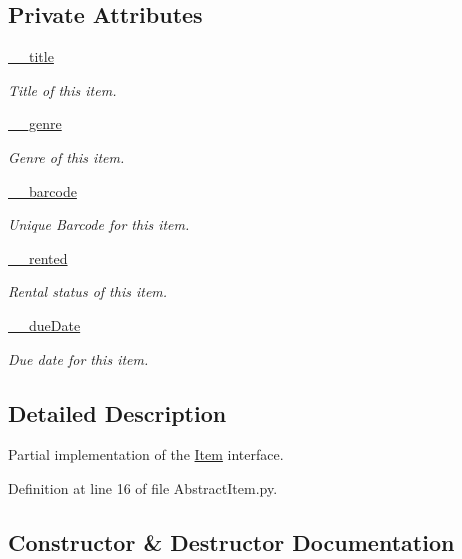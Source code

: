 \subsection*{Private Attributes}
\begin{DoxyCompactItemize}
\item 
\hyperlink{classAbstractItem_1_1AbstractItem_a2f4dc201ed6687e84b1b1b03863443c7}{\+\_\+\+\_\+title}
\begin{DoxyCompactList}\small\item\em Title of this item. \end{DoxyCompactList}\item 
\hyperlink{classAbstractItem_1_1AbstractItem_a9a18f410b1160da5c633a92ff228e5ee}{\+\_\+\+\_\+genre}
\begin{DoxyCompactList}\small\item\em Genre of this item. \end{DoxyCompactList}\item 
\hyperlink{classAbstractItem_1_1AbstractItem_a37fae73390cb431a6395a07ce5b5a5c7}{\+\_\+\+\_\+barcode}
\begin{DoxyCompactList}\small\item\em Unique Barcode for this item. \end{DoxyCompactList}\item 
\hyperlink{classAbstractItem_1_1AbstractItem_a5da9a42e491e8eb843fae960748ec7e7}{\+\_\+\+\_\+rented}
\begin{DoxyCompactList}\small\item\em Rental status of this item. \end{DoxyCompactList}\item 
\hyperlink{classAbstractItem_1_1AbstractItem_a6975f7e62b35b3162dd9c3aef089c1a3}{\+\_\+\+\_\+due\+Date}
\begin{DoxyCompactList}\small\item\em Due date for this item. \end{DoxyCompactList}\end{DoxyCompactItemize}


\subsection{Detailed Description}
Partial implementation of the \hyperlink{namespaceItem}{Item} interface. 

Definition at line 16 of file Abstract\+Item.\+py.



\subsection{Constructor \& Destructor Documentation}
\mbox{\label{classAbstractItem_1_1AbstractItem_a33578b09c4f0fd29c582bdd0e0977577}} 
